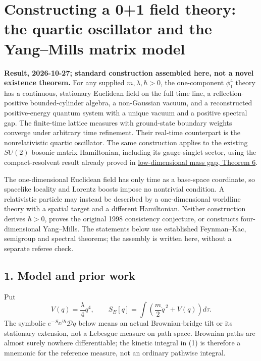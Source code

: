 \documentclass[11pt,a4paper]{article}
\begin{document}
\hypertarget{constructing-a-01-field-theory-the-quartic-oscillator-and-the-yangmills-matrix-model}{%
\section{Constructing a 0+1 field theory: the quartic oscillator and the
Yang--Mills matrix
model}\label{constructing-a-01-field-theory-the-quartic-oscillator-and-the-yangmills-matrix-model}}

\textbf{Result, 2026-10-27; standard construction assembled here, not a
novel existence theorem.} For any supplied \(m,\lambda,\hbar>0\), the
one-component \(\phi^4_1\) theory has a continuous, stationary Euclidean
field on the full time line, a reflection-positive bounded-cylinder
algebra, a non-Gaussian vacuum, and a reconstructed positive-energy
quantum system with a unique vacuum and a positive spectral gap. The
finite-time lattice measures with ground-state boundary weights converge
under arbitrary time refinement. Their real-time counterpart is the
nonrelativistic quartic oscillator. The same construction applies to the
existing \(SU(2)\) bosonic matrix Hamiltonian, including its
gauge-singlet sector, using the compact-resolvent result already proved
in \href{low-dimensional-mass-gap.md}{low-dimensional mass gap, Theorem
6}.

The one-dimensional Euclidean field has only time as a base-space
coordinate, so spacelike locality and Lorentz boosts impose no
nontrivial condition. A relativistic particle may instead be described
by a one-dimensional worldline theory with a spatial target and a
different Hamiltonian. Neither construction derives \(\hbar>0\), proves
the original 1998 consistency conjecture, or constructs four-dimensional
Yang--Mills. The statements below use established Feynman--Kac,
semigroup and spectral theorems; the assembly is written here, without a
separate referee check.

\hypertarget{model-and-prior-work}{%
\subsection{1. Model and prior work}\label{model-and-prior-work}}

Put \[
 V(q)=\frac{\lambda}{4}q^4,\qquad
 S_E[q]=\int\left(\frac m2\dot q^{\,2}+V(q)\right)d\tau.
 \tag{1}
\] The symbolic \(e^{-S_E/\hbar}\mathcal Dq\) below means an actual
Brownian-bridge tilt or its stationary extension, not a Lebesgue measure
on path space. Brownian paths are almost surely nowhere differentiable;
the kinetic integral in (1) is therefore a mnemonic for the reference
measure, not an ordinary pathwise integral.
\end{document}
